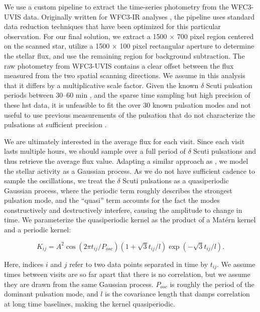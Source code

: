\documentclass[longauth]{aa} %
\begin{document}
We use a custom pipeline to extract the time-series photometry from the WFC3-UVIS data.  Originally written for WFC3-IR analyses \citep[e.g.,][]{Stevenson2014a, Stevenson2014c}, the pipeline uses standard data reduction techniques that have been optimized for this particular observation.  For our final solution, we extract a 1500 $\times$ 700 pixel region centered on the scanned star, utilize a 1500 $\times$ 100 pixel rectangular aperture to determine the stellar flux, and use the remaining region for background subtraction.
%
The raw photometry from WFC3-UVIS contains a clear offset between the flux measured from the two spatial scanning directions.
%
We assume in this analysis that it differs by a multiplicative scale factor.
%
Given the known $\delta$ Scuti pulsation periods between 30--60 min \citep{koen2003a, koen2003b},
and the sparse time sampling but high precision of these \ac{hst} data, it is unfeasible to fit the over 30 known pulsation modes and not useful to use previous measurements of the pulsation that do not characterize the pulsations at sufficient precision \citep{Mekarnia2017}.

We are ultimately interested in the average flux for each visit.
%
Since each visit lasts multiple hours, we should sample over a full period of $\delta$ Scuti pulsations and thus retrieve the average flux value.
%
Adapting a similar approach as \citet{Johnson2015}, we model the stellar activity as a Gaussian process.
%
As we do not have sufficient cadence to sample the oscillations, we treat the $\delta$ Scuti pulsations as a quasiperiodic Gaussian process, where the periodic term roughly describes the strongest pulsation mode, and the ``quasi'' term accounts for the fact the modes constructively and destructively interfere, causing the amplitude to change in time.
%
We parameterize the quasiperiodic kernel as the product of a Mat\'ern kernel and a periodic kernel:

\begin{equation}
 K_{ij} = A^2 \cos\left(2\pi t_{ij}/P_{osc}\right) (1 + \sqrt{3}t_{ij}/l) \exp\left(-\sqrt{3}t_{ij}/l\right).
\end{equation}

Here, indices $i$ and $j$ refer to two data points separated in time by $t_{ij}$.
%
We assume times between visits are so far apart that there is no correlation, but we assume they are drawn from the same Gaussian process.
%
$P_{osc}$ is roughly the period of the dominant pulsation mode, and $l$ is the covariance length that damps correlation at long time baselines, making the kernel quasiperiodic.
\end{document}
